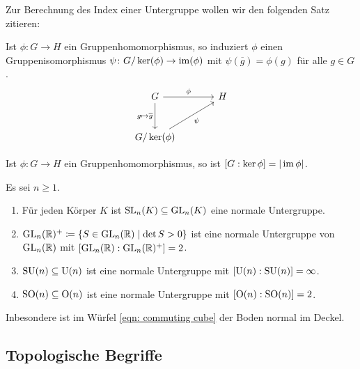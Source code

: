 Zur Berechnung des Index einer Untergruppe wollen wir den folgenden Satz zitieren:


\begin{theorem}[1.\ Isomorphiesatz]
  Ist $\phi \colon G \to H$ ein Gruppenhomomorphismus, so induziert $\phi$ einen Gruppenisomorphismus $\psi \colon G/\ker(\phi) \to \operatorname{im}(\phi)$ mit $\psi(\overline{g}) = \phi(g)$ für alle $g \in G$.
  \[
    \begin{tikzcd}[row sep = large, column sep = large]
        G
        \arrow[r, "\phi"]
        \arrow[d, "g \mapsto \overline{g}"']
      & H
      \\
        G/\ker(\phi)
        \arrow[ru, "\psi"']
      & {}
    \end{tikzcd}
  \]
\end{theorem}


\begin{corollary}
  Ist $\phi \colon G \to H$ ein Gruppenhomomorphismus, so ist $[G : \ker \phi] = |\operatorname{im} \phi|$.
\end{corollary}


\begin{proposition}
  Es sei $n \geq 1$.
  \begin{enumerate}[leftmargin=*, label=\roman*)]
    \item
      Für jeden Körper $K$ ist $\mathrm{SL}_n(K) \subseteq \mathrm{GL}_n(K)$ eine normale Untergruppe.
    \item
      $\mathrm{GL}_n(\mathbb{R})^+ \coloneqq \{S \in \mathrm{GL}_n(\mathbb{R}) \mid \det S > 0\}$ ist eine normale Untergruppe von $\mathrm{GL}_n(\mathbb{R})$ mit $[\mathrm{GL}_n(\mathbb{R}) : \mathrm{GL}_n(\mathbb{R})^+] = 2$.
    \item
      $\mathrm{SU}(n) \subseteq \mathrm{U}(n)$ ist eine normale Untergruppe mit $[\mathrm{U}(n) : \mathrm{SU}(n)] = \infty$.
    \item
      $\mathrm{SO}(n) \subseteq \mathrm{O}(n)$ ist eine normale Untergruppe mit $[\mathrm{O}(n) : \mathrm{SO}(n)] = 2$.
  \end{enumerate}
  Inbesondere ist im Würfel \eqref{eqn: commuting cube} der Boden normal im Deckel.
\end{proposition}














\subsection{Topologische Begriffe}


